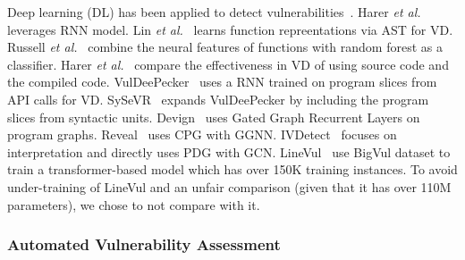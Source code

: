 Deep learning (DL) has been applied
to detect
vulnerabilities~\cite{li2021vulnerability,zhou2019devign,li2021vuldeelocator,li2020automated,chakraborty2021deep,hin2022linevd,scandariato2014predicting,neuhaus2007predicting,shin2010evaluating,neuhaus2009beauty,yamaguchi2012generalized,yamaguchi2011vulnerability}.
Harer {\em et al.}~\cite{harer2018learning} leverages RNN model. Lin
{\em et al.}~\cite{lin2017poster} learns function repreentations via
AST for VD. Russell {\em et al.}~\cite{russell2018automated} combine
the neural features of functions with random forest as
a classifier.
Harer {\em et al.}~\cite{harer2018automated} compare the
effectiveness in VD of using source code and the compiled
code. VulDeePecker~\cite{li2018vuldeepecker} uses a RNN trained on
program slices from API calls for VD. SySeVR~\cite{li2021sysevr}
expands VulDeePecker by including the program slices from 
syntactic units. Devign~\cite{zhou2019devign} uses Gated Graph
Recurrent Layers on program
graphs. Reveal~\cite{chakraborty2020deep} uses CPG with
GGNN. IVDetect~\cite{li2021vulnerability} focuses on interpretation
and directly uses PDG with GCN. LineVul~\cite{linevul-msr22} use
BigVul dataset to train a transformer-based model which has over 150K
training instances. To avoid under-training of LineVul and an unfair
comparison (given that it has over 110M parameters), we chose to not
compare with it.



\vspace{-2pt}
\subsubsection*{\bf Automated Vulnerability Assessment}

